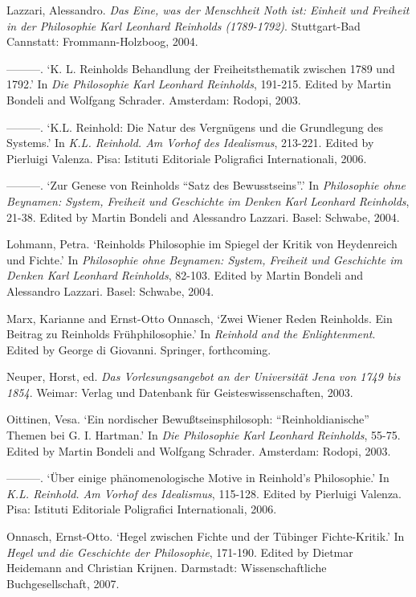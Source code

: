 Lazzari, Alessandro. \textit{Das Eine, was der Menschheit Noth ist: Einheit und Freiheit in der Philosophie Karl Leonhard Reinholds (1789{-}1792)}. Stuttgart{-}Bad Cannstatt: Frommann{-}Holzboog, 2004.

{---}{---}{---}. `K. L. Reinholds Behandlung der Freiheitsthematik zwischen 1789 und 1792.' In \textit{Die Philosophie Karl Leonhard Reinholds}, 191{-}215. Edited by Martin Bondeli and Wolfgang Schrader. Amsterdam: Rodopi, 2003.

{---}{---}{---}. `K.L. Reinhold: Die Natur des Vergn\"{u}gens und die Grundlegung des Systems.' In \textit{K.L. Reinhold. Am Vorhof des Idealismus}, 213{-}221. Edited by Pierluigi Valenza. Pisa: Istituti Editoriale Poligrafici Internationali, 2006.

{---}{---}{---}. `Zur Genese von Reinholds ``Satz des Bewusstseins''.' In \textit{Philosophie ohne Beynamen: System, Freiheit und Geschichte im Denken Karl Leonhard Reinholds}, 21{-}38. Edited by Martin Bondeli and Alessandro Lazzari. Basel: Schwabe, 2004.

Lohmann, Petra. `Reinholds Philosophie im Spiegel der Kritik von Heydenreich und Fichte.' In \textit{Philosophie ohne Beynamen: System, Freiheit und Geschichte im Denken Karl Leonhard Reinholds}, 82{-}103. Edited by Martin Bondeli and Alessandro Lazzari. Basel: Schwabe, 2004.

Marx, Karianne and Ernst{-}Otto Onnasch, `Zwei Wiener Reden Reinholds. Ein Beitrag zu Reinholds Fr\"{u}hphilosophie.' In \textit{Reinhold and the Enlightenment}. Edited by George di Giovanni. Springer, forthcoming.

Neuper, Horst, ed. \textit{Das Vorlesungsangebot an der Universit\"{a}t Jena von 1749 bis 1854}. Weimar: Verlag und Datenbank f\"{u}r Geisteswissenschaften, 2003.

Oittinen, Vesa. `Ein nordischer Bewu\ss{}tseinsphilosoph: ``Reinholdianische'' Themen bei G. I. Hartman.' In \textit{Die Philosophie Karl Leonhard Reinholds}, 55{-}75. Edited by Martin Bondeli and Wolfgang Schrader. Amsterdam: Rodopi, 2003.

{---}{---}{---}. `\"{U}ber einige ph\"{a}nomenologische Motive in Reinhold's Philosophie.' In \textit{K.L. Reinhold. Am Vorhof des Idealismus}, 115{-}128. Edited by Pierluigi Valenza. Pisa: Istituti Editoriale Poligrafici Internationali, 2006.

Onnasch, Ernst{-}Otto. `Hegel zwischen Fichte und der T\"{u}binger Fichte{-}Kritik.' In \textit{Hegel und die Geschichte der Philosophie}, 171{-}190. Edited by Dietmar Heidemann and Christian Krijnen. Darmstadt: Wissenschaftliche Buchgesellschaft, 2007. 

